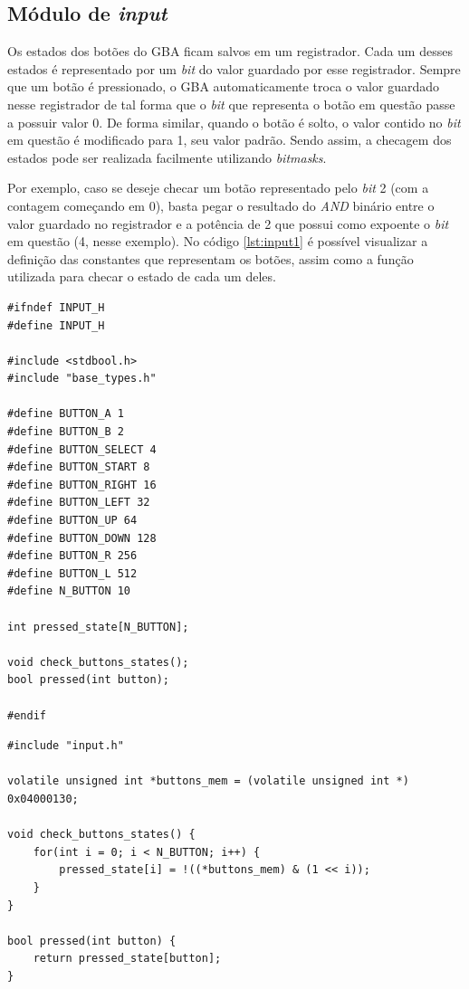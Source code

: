 \subsection{Módulo de \textit{input}}

Os estados dos botões do GBA ficam salvos em um registrador. Cada um desses estados é representado por um \textit{bit} do valor guardado por esse registrador. Sempre que um botão é pressionado, o GBA automaticamente troca o valor guardado nesse registrador de tal forma que o \textit{bit} que representa o botão em questão passe a possuir valor 0. De forma similar, quando o botão é solto, o valor contido no \textit{bit} em questão é modificado para 1, seu valor padrão. Sendo assim, a checagem dos estados pode ser realizada facilmente utilizando \textit{bitmasks}.

Por exemplo, caso se deseje checar um botão representado pelo \textit{bit} 2 (com a contagem começando em 0), basta pegar o resultado do \textit{AND} binário entre o valor guardado no registrador e a potência de 2 que possui como expoente o \textit{bit} em questão (4, nesse exemplo). No código \ref{lst:input1} é possível visualizar a definição das constantes que representam os botões, assim como a função utilizada para checar o estado de cada um deles.

\vspace{\onelineskip}
\begin{lstlisting}[float,caption={Cabeçalho do módulo de \textit{input}.},label={lst:input1}]
#ifndef INPUT_H
#define INPUT_H

#include <stdbool.h>
#include "base_types.h"

#define BUTTON_A 1
#define BUTTON_B 2
#define BUTTON_SELECT 4
#define BUTTON_START 8
#define BUTTON_RIGHT 16
#define BUTTON_LEFT 32
#define BUTTON_UP 64
#define BUTTON_DOWN 128
#define BUTTON_R 256
#define BUTTON_L 512
#define N_BUTTON 10

int pressed_state[N_BUTTON];

void check_buttons_states();
bool pressed(int button);

#endif
\end{lstlisting}
\vspace{\onelineskip}

\vspace{\onelineskip}
\begin{lstlisting}[float,caption={Código-fonte do módulo de \textit{input}.}]
#include "input.h"

volatile unsigned int *buttons_mem = (volatile unsigned int *) 0x04000130;

void check_buttons_states() {
    for(int i = 0; i < N_BUTTON; i++) {
        pressed_state[i] = !((*buttons_mem) & (1 << i));
    }
}

bool pressed(int button) {
    return pressed_state[button];
}
\end{lstlisting}
\vspace{\onelineskip}

